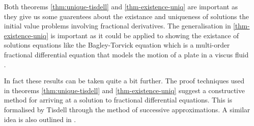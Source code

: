 Both theorems \ref{thm:unique-tisdell} and \ref{thm-existence-uniq} are important as they give us some guarentees about the existance and uniqueness of solutions the initial value problems involving fractional derivatives. The generalisation in \ref{thm-existence-uniq} is important as it could be applied to showing the existance of solutions equations like the Bagley-Torvick equation which is a multi-order fractional differential equation that models the motion of a plate in a viscus fluid \cite{Diethelm2002-3, Podlubny1999, Torvik1984}.

In fact these results can be taken quite a bit further. The proof techniques used in theorems \ref{thm:unique-tisdell} and \ref{thm-existence-uniq} suggest a constructive method for arriving at a solution to fractional differential equations. This is formalised by Tisdell \cite{Tisdell2012} through the method of successive approximations. A similar idea is also outlined in \cite{Podlubny1999}.

\clearpage

